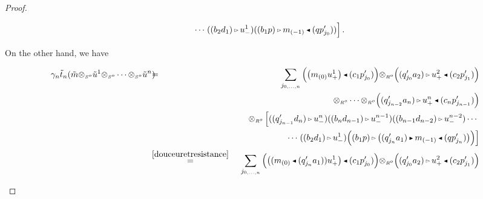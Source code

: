 \documentclass[reqno, a4paper, 10pt]{amsart}
\numberwithin{equation}{section}
\theoremstyle{plain}
\theoremstyle{definition}
\theoremstyle{remark}
\begin{document}
\begin{proof}
\begin{footnotesize}
\begin{equation*}
\begin{split}
& \qquad 
\cdots \left. \underset{}{} ( (b_2d_1){{\,\raise1pt\hbox{$\scriptscriptstyle{\rhd}$} \, }} u^1_{-}) ( (b_1p) {{\,\raise1pt\hbox{$\scriptscriptstyle{\rhd}$} \, }} m_{(-1)}{{\,\raise1pt\hbox{$\scriptscriptstyle{\blacktriangleleft}$} \, }}(qp_{j_0}')) \right].
\end{split}
\end{equation*}
\end{footnotesize}
On the other hand, we have 
\begin{footnotesize}
\begin{eqnarray*}
\gamma_n{\tilde{{t}}}_n({\tilde{{m}}}{\otimes_{\scriptscriptstyle{{\scriptscriptstyle{{S^{o}}}}}}}{\tilde{{u}}}^1 {\otimes_{\scriptscriptstyle{{\scriptscriptstyle{{S^{o}}}}}}}\cdots{\otimes_{\scriptscriptstyle{{\scriptscriptstyle{{S^{o}}}}}}} {\tilde{{u}}}^n)
 \!\!\!\!&=\!\!\!\!&  \sum_{j_{0,\ldots,n}} \Big( {\big( {m_{(0)}u_{+}^1} \big)} {{\,\raise1pt\hbox{$\scriptscriptstyle{\blacktriangleleft}$} \, }} (c_1p_{j_0}')\Big) {\otimes_{\scriptscriptstyle{{\scriptscriptstyle{{R^{o}}}}}}} \Big( (q_{j_0}'a_2){{\,\raise1pt\hbox{$\scriptscriptstyle{\rhd}$} \, }} u_{+}^2 {{\,\raise1pt\hbox{$\scriptscriptstyle{\blacktriangleleft}$} \, }} (c_2p_{j_1}')\Big) \\
&& \qquad 
{\otimes_{\scriptscriptstyle{{\scriptscriptstyle{{R^{o}}}}}}} \cdots{\otimes_{\scriptscriptstyle{{\scriptscriptstyle{{R^{o}}}}}}}\Big( (q_{j_{n-2}}'a_n) {{\,\raise1pt\hbox{$\scriptscriptstyle{\rhd}$} \, }} u_{+}^n {{\,\raise1pt\hbox{$\scriptscriptstyle{\blacktriangleleft}$} \, }} (c_np_{j_{n-1}}')\Big) \\
&& \qquad   
{\otimes_{\scriptscriptstyle{{\scriptscriptstyle{{R^{o}}}}}}}\left[\underset{}{} ((q_{j_{n-1}}'d_n){{\,\raise1pt\hbox{$\scriptscriptstyle{\rhd}$} \, }} u^n_{-})((b_nd_{n-1}) {{\,\raise1pt\hbox{$\scriptscriptstyle{\rhd}$} \, }} u^{n-1}_{-}) ((b_{n-1}d_{n-2}) {{\,\raise1pt\hbox{$\scriptscriptstyle{\rhd}$} \, }} u^{n-2}_{-}) \cdots \right. \\
&& \qquad\qquad  
\cdots \left.\underset{}{} ((b_2d_1) {{\,\raise1pt\hbox{$\scriptscriptstyle{\rhd}$} \, }} u^1_{-}) \Big( (b_1p) {{\,\raise1pt\hbox{$\scriptscriptstyle{\rhd}$} \, }} {\big( { (q_{j_n}'a_1) {{\,\raise1pt\hbox{$\scriptscriptstyle{\blacktriangleright}$} \, }} m_{(-1)}{{\,\raise1pt\hbox{$\scriptscriptstyle{\blacktriangleleft}$} \, }}(qp_{j_n}')} \big)} \Big) \right] \\
\!\!\!\!
&\overset{\eqref{douceuretresistance}}{=}\!\!\!\!&  \sum_{j_{0,\ldots,n}} \Big( {\big( {(m_{(0)}{{\,\raise1pt\hbox{$\scriptscriptstyle{\blacktriangleleft}$} \, }}(q_{j_n}'a_1))u_{+}^1} \big)} {{\,\raise1pt\hbox{$\scriptscriptstyle{\blacktriangleleft}$} \, }} (c_1p_{j_0}')\Big) {\otimes_{\scriptscriptstyle{{\scriptscriptstyle{{R^{o}}}}}}} \Big( (q_{j_0}'a_2){{\,\raise1pt\hbox{$\scriptscriptstyle{\rhd}$} \, }} u_{+}^2 {{\,\raise1pt\hbox{$\scriptscriptstyle{\blacktriangleleft}$} \, }} (c_2p_{j_1}')\Big) \\ 

\end{eqnarray*}
\end{footnotesize}
\end{proof}
\end{document}

